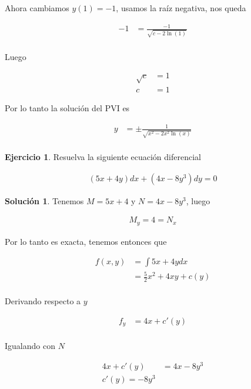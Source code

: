 \documentclass{article}
\theoremstyle{plain}
\theoremstyle{definition}
\newtheorem{ejer}[thm]{Ejercicio}
\newtheorem{sol}[thm]{Solución}
\begin{document}
Ahora cambiamos $y(1)=-1$, usamos la raíz negativa, nos queda

\begin{align*}
 -1 &= \frac{-1}{\sqrt{c-2\ln(1) }}\\
\end{align*}

Luego

\begin{align*}
 \sqrt{c } &= 1\\
  c &= 1
\end{align*}

Por lo tanto la solución del PVI es

\begin{align*}
 y &= \pm \frac{1}{\sqrt{x^2-2x^2\ln(x) }}\\
\end{align*}

\newpage

\begin{ejer}Resuelva la siguiente ecuación diferencial \\
\end{ejer}

\begin{align*}
    (5x+4y)dx+(4x-8y^3)dy=0
\end{align*}

\begin{sol}Tenemos $M= 5x+4$ y  $N= 4x-8y^3$, luego
\end{sol}

\begin{align*}
    M_y= 4 =N_x
\end{align*}

Por lo tanto es exacta, tenemos entonces que

\begin{align*}
    f(x,y) &= \int 5x+4y dx \\
    &= \frac{5}{2}x^2+4xy+c(y) \\
\end{align*}

Derivando respecto a $y$

\begin{align*}
    f_y &= 4x+c'(y) \\
\end{align*}

Igualando con $N$

\begin{align*}
     4x+c'(y) &= 4x-8y^3\\
     c'(y)=-8y^3
\end{align*}
\end{document}
